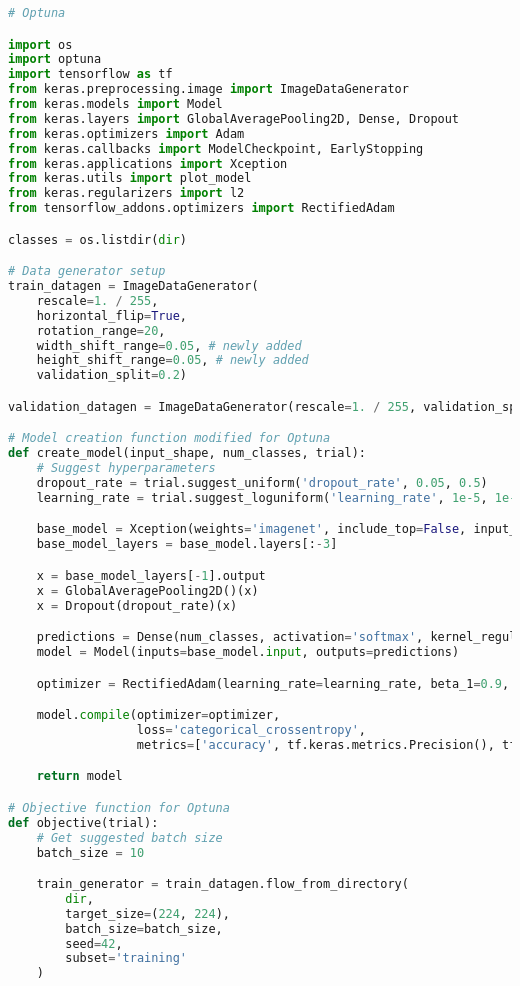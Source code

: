 \begin{lstlisting}[language=Python]
# Optuna

import os
import optuna
import tensorflow as tf
from keras.preprocessing.image import ImageDataGenerator
from keras.models import Model
from keras.layers import GlobalAveragePooling2D, Dense, Dropout
from keras.optimizers import Adam
from keras.callbacks import ModelCheckpoint, EarlyStopping
from keras.applications import Xception
from keras.utils import plot_model
from keras.regularizers import l2
from tensorflow_addons.optimizers import RectifiedAdam

classes = os.listdir(dir)

# Data generator setup
train_datagen = ImageDataGenerator(
    rescale=1. / 255,
    horizontal_flip=True,
    rotation_range=20,
    width_shift_range=0.05, # newly added
    height_shift_range=0.05, # newly added
    validation_split=0.2)

validation_datagen = ImageDataGenerator(rescale=1. / 255, validation_split=0.2)

# Model creation function modified for Optuna
def create_model(input_shape, num_classes, trial):
    # Suggest hyperparameters
    dropout_rate = trial.suggest_uniform('dropout_rate', 0.05, 0.5)
    learning_rate = trial.suggest_loguniform('learning_rate', 1e-5, 1e-3)

    base_model = Xception(weights='imagenet', include_top=False, input_shape=(224,224,3))
    base_model_layers = base_model.layers[:-3]

    x = base_model_layers[-1].output
    x = GlobalAveragePooling2D()(x)
    x = Dropout(dropout_rate)(x)

    predictions = Dense(num_classes, activation='softmax', kernel_regularizer=l2(0.1), dtype='float64')(x)
    model = Model(inputs=base_model.input, outputs=predictions)

    optimizer = RectifiedAdam(learning_rate=learning_rate, beta_1=0.9, beta_2=0.999, epsilon=1e-08)

    model.compile(optimizer=optimizer,
                  loss='categorical_crossentropy',
                  metrics=['accuracy', tf.keras.metrics.Precision(), tf.keras.metrics.Recall(), 'categorical_accuracy'])

    return model

# Objective function for Optuna
def objective(trial):
    # Get suggested batch size
    batch_size = 10

    train_generator = train_datagen.flow_from_directory(
        dir,
        target_size=(224, 224),
        batch_size=batch_size,
        seed=42,
        subset='training'
    )


\end{lstlisting}
